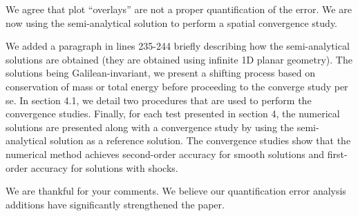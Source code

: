 \documentclass{article}
\begin{document}
We agree that plot "`overlays"' are not a proper quantification of the error. We are now using the semi-analytical solution to perform a spatial convergence study.

We added a paragraph in lines 235-244 briefly describing how the semi-analytical solutions are obtained
(they are obtained using infinite 1D planar geometry). The solutions being Galilean-invariant, we present a shifting
process based on conservation of mass or total energy before proceeding to the converge study per se. 
In section 4.1, we detail two procedures that are used to perform the convergence studies. Finally, for each test presented in section 4, the numerical solutions are presented along with a convergence study by using the semi-analytical solution as a reference solution. The convergence studies show that the numerical method achieves second-order accuracy for smooth solutions and first-order accuracy for solutions with shocks. 

We are thankful for your comments. We believe our quantification error analysis additions have significantly strengthened the paper.

\bigskip
\end{document}
